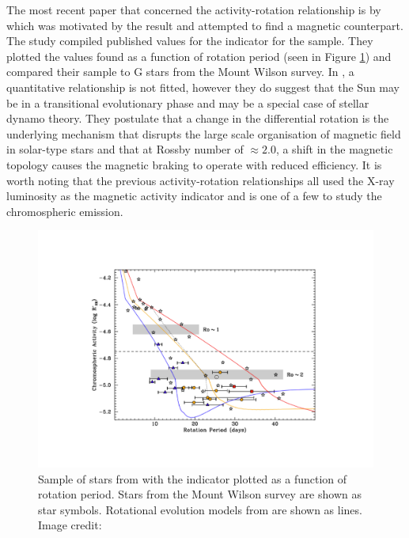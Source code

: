 The most recent paper that concerned the activity-rotation relationship is by \citet{Metcalfe_etal_2016} which was motivated by the \citet{van_Saders_etal_2016} result and attempted to find a magnetic counterpart. The study compiled published values for the \Rprime indicator for the \citet{van_Saders_etal_2016} sample. They plotted the values found as a function of rotation period (seen in Figure \ref{fig:metcalfe_etal_2016_plot}) and compared their sample to G stars from the Mount Wilson survey. In \citet{Metcalfe_etal_2016}, a quantitative relationship is not fitted, however they do suggest that the Sun may be in a transitional evolutionary phase and may be a special case of stellar dynamo theory. They postulate that a change in the differential rotation is the underlying mechanism that disrupts the large scale organisation of magnetic field in solar-type stars and that at Rossby number of $\approx 2.0$, a shift in the magnetic topology causes the magnetic braking to operate with reduced efficiency. It is worth noting that the previous activity-rotation relationships all used the X-ray luminosity as the magnetic activity indicator and \citet{Metcalfe_etal_2016} is one of a few to study the chromospheric emission.

\begin{figure}
    \centering
    \includegraphics[scale=0.5]{Figures/2-Historical_overview/metcalfe_etal_2016_fig1.pdf}
    \caption[Chromospheric emission as a function of rotation period for sample of older stars]{Sample of stars from \citet{Metcalfe_etal_2016} with the \Rprime indicator plotted as a function of rotation period. Stars from the Mount Wilson survey are shown as star symbols. Rotational evolution models from \citet{van_Saders_etal_2016} are shown as lines. Image credit: \citet{Metcalfe_etal_2016}}
    \label{fig:metcalfe_etal_2016_plot}
\end{figure}


